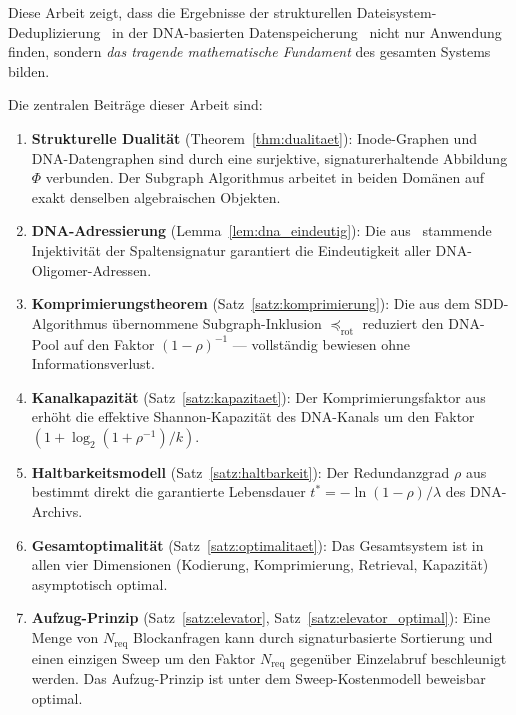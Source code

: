 ﻿\documentclass[a4paper,12pt]{article}
\theoremstyle{definition}
\theoremstyle{plain}
\begin{document}
Diese Arbeit zeigt, dass die Ergebnisse der strukturellen
Dateisystem-Deduplizierung~\cite{dusgraph} in der DNA-basierten
Datenspeicherung~\cite{dnastor} nicht nur Anwendung finden, sondern
\emph{das tragende mathematische Fundament} des gesamten Systems bilden.

Die zentralen Beiträge dieser Arbeit sind:

\begin{enumerate}
  \item \textbf{Strukturelle Dualität} (Theorem~\ref{thm:dualitaet}):
        Inode-Graphen und DNA-Datengraphen sind durch eine surjektive,
        signaturerhaltende Abbildung $\Phi$ verbunden.  Der Subgraph Algorithmus
        arbeitet in beiden Domänen auf exakt denselben algebraischen Objekten.

  \item \textbf{DNA-Adressierung} (Lemma~\ref{lem:dna_eindeutig}):
        Die aus~\cite{dusgraph} stammende Injektivität der Spaltensignatur
        garantiert die Eindeutigkeit aller DNA-Oligomer-Adressen.

  \item \textbf{Komprimierungstheorem} (Satz~\ref{satz:komprimierung}):
        Die aus dem SDD-Algorithmus übernommene Subgraph-Inklusion
        $\preceq_{\mathrm{rot}}$ reduziert den DNA-Pool auf den
        Faktor $(1-\rho)^{-1}$ --- vollständig bewiesen ohne Informationsverlust.

  \item \textbf{Kanalkapazität} (Satz~\ref{satz:kapazitaet}):
        Der Komprimierungsfaktor aus~\cite{dusgraph} erhöht die effektive
        Shannon-Kapazität des DNA-Kanals um den Faktor
        $(1 + \log_2(1+\rho^{-1})/k)$.

  \item \textbf{Haltbarkeitsmodell} (Satz~\ref{satz:haltbarkeit}):
        Der Redundanzgrad $\rho$ aus~\cite{dusgraph} bestimmt direkt die
        garantierte Lebensdauer $t^* = -\ln(1-\rho)/\lambda$ des DNA-Archivs.

  \item \textbf{Gesamtoptimalität} (Satz~\ref{satz:optimalitaet}):
        Das Gesamtsystem ist in allen vier Dimensionen (Kodierung,
        Komprimierung, Retrieval, Kapazität) asymptotisch optimal.

  \item \textbf{Aufzug-Prinzip} (Satz~\ref{satz:elevator},
        Satz~\ref{satz:elevator_optimal}): Eine Menge von $N_{\mathrm{req}}$
        Blockanfragen kann durch signaturbasierte Sortierung und einen
        einzigen Sweep um den Faktor $N_{\mathrm{req}}$ gegenüber
        Einzelabruf beschleunigt werden.  Das Aufzug-Prinzip ist unter
        dem Sweep-Kostenmodell beweisbar optimal.


\end{enumerate}
\end{document}
